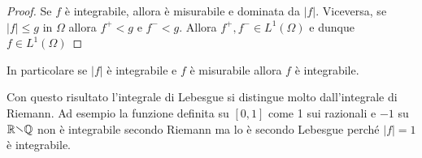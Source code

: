 \begin{proof}
    Se \(f\)  è integrabile, allora è misurabile e dominata da
        \(|f|\). Viceversa, se
    \(|f| \le g\) in \(\Omega\) allora \(f^{+} < g\) e
        \(f^{-} < g\). Allora \(f^{+}, f^{-} \in L^{1}{(\Omega)}\) e dunque \(f
        \in L^{1}{(\Omega)}\)
\end{proof}
\begin{corollary}
    In particolare se \(|f|\) è integrabile e \(f\) è misurabile allora \(f\) è
    integrabile.
\end{corollary}
Con questo risultato l'integrale di Lebesgue si distingue molto dall'integrale
di Riemann. Ad esempio la funzione definita su \([0, 1]\) come 1 sui razionali e
\(-1\) su \(\mathbb{R}\sminus \mathbb{Q}\) non è integrabile secondo Riemann ma
lo è secondo Lebesgue perché \(|f| = 1\) è integrabile.

